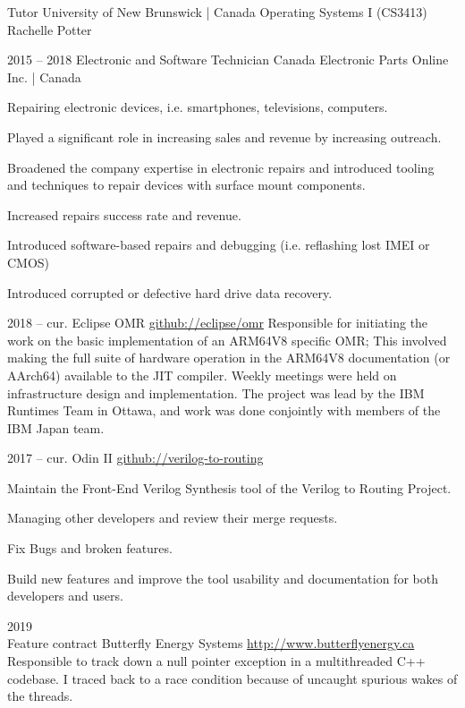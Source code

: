\documentclass{developercv} %
\begin{document}
\begin{entrylist}
	{Tutor}
	{University of New Brunswick | Canada}{
	\textbullet{} Operating Systems I (CS3413) Rachelle Potter
	}

	\entry
	{2015 -- 2018}
	{Electronic and Software Technician}
	{Canada Electronic Parts Online Inc. | Canada}{
		Repairing electronic devices, i.e. smartphones, televisions, computers.
		\begin{tightemize}
			\item Played a significant role in increasing sales and revenue by increasing outreach.
			\item Broadened the company expertise in electronic repairs and introduced tooling and techniques to repair devices with surface mount components.
			\item Increased repairs success rate and revenue.
			\item Introduced software-based repairs and debugging (i.e. reflashing lost IMEI or CMOS)
			\item Introduced corrupted or defective hard drive data recovery.
		\end{tightemize}
	}

\end{entrylist}


\begin{entrylist}

	\entry
	{2018 -- cur.}
	{Eclipse OMR}
	{\href{https://github.com/eclipse/omr}{github://eclipse/omr}}{
		Responsible for initiating the work on the basic implementation of an ARM64V8 specific OMR; This involved making the full suite of hardware operation in the ARM64V8 documentation (or AArch64) available to the JIT compiler.
		Weekly meetings were held on infrastructure design and implementation.
		The project was lead by the IBM Runtimes Team in Ottawa, and work was done conjointly with members of the IBM Japan team.
	}

	\entry
	{2017 -- cur.}
	{Odin II}
	{\href{https://github.com/verilog-to-routing/vtr-verilog-to-routing/graphs/contributors}{github://verilog-to-routing}}{
		Maintain the Front-End Verilog Synthesis tool of the Verilog to Routing Project.
		\begin{tightemize}
			\item Managing other developers and review their merge requests.
			\item Fix Bugs and broken features.
			\item Build new features and improve the tool usability and documentation for both developers and users.
		\end{tightemize}
	}

	\entry
	{2019 \\{\footnotesize Feature contract}}
	{Butterfly Energy Systems}
	{\href{http://www.butterflyenergy.ca/home.php}{http://www.butterflyenergy.ca}}{
	Responsible to track down a null pointer exception in a multithreaded C++ codebase.
	I traced back to a race condition because of uncaught spurious wakes of the threads.
	}

\end{entrylist}
\end{document}

